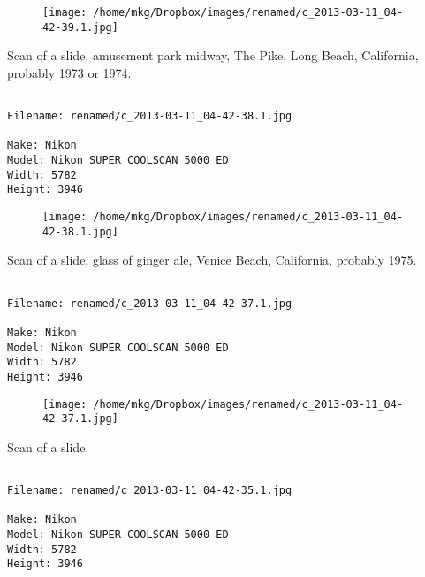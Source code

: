 \begin{figure}
\texttt{[image: /home/mkg/Dropbox/images/renamed/c\_2013-03-11\_04-42-39.1.jpg]}
\end{figure}
    
\clearpage
\onecolumn
\noindent Scan of a slide, amusement park midway, The Pike, Long Beach, California, probably 1973 or 1974.
\noindent
\begin{lstlisting}

Filename: renamed/c_2013-03-11_04-42-38.1.jpg

Make: Nikon
Model: Nikon SUPER COOLSCAN 5000 ED
Width: 5782
Height: 3946
\end{lstlisting}
\clearpage

\begin{figure}
\texttt{[image: /home/mkg/Dropbox/images/renamed/c\_2013-03-11\_04-42-38.1.jpg]}
\end{figure}
    
\clearpage
\onecolumn
\noindent Scan of a slide, glass of ginger ale, Venice Beach, California, probably 1975.
\noindent
\begin{lstlisting}

Filename: renamed/c_2013-03-11_04-42-37.1.jpg

Make: Nikon
Model: Nikon SUPER COOLSCAN 5000 ED
Width: 5782
Height: 3946
\end{lstlisting}
\clearpage

\begin{figure}
\texttt{[image: /home/mkg/Dropbox/images/renamed/c\_2013-03-11\_04-42-37.1.jpg]}
\end{figure}
    
\clearpage
\onecolumn
\noindent Scan of a slide.
\noindent
\begin{lstlisting}

Filename: renamed/c_2013-03-11_04-42-35.1.jpg

Make: Nikon
Model: Nikon SUPER COOLSCAN 5000 ED
Width: 5782
Height: 3946
\end{lstlisting}
\clearpage

